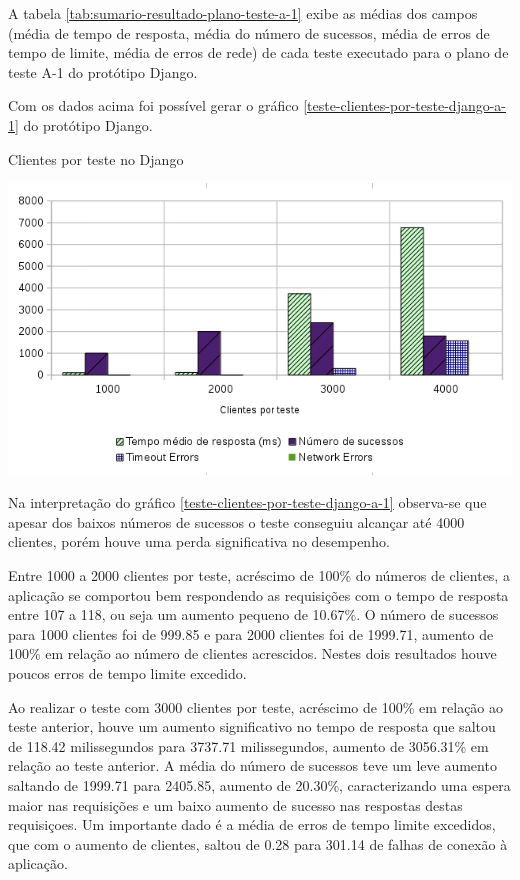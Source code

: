   A tabela \ref{tab:sumario-resultado-plano-teste-a-1} exibe as médias dos campos (média de tempo de resposta,
  média do número de sucessos, média de erros de tempo de limite, média de erros de rede) de cada teste executado
  para o plano de teste A-1 do protótipo Django.

  Com os dados acima foi possível gerar o gráfico \ref{teste-clientes-por-teste-django-a-1} do
  protótipo Django.

  \begin{grafico}[H]
    \setlength{\abovecaptionskip}{5pt}
    \setlength{\belowcaptionskip}{0pt}
    
    \caption[Clientes por teste no Django]
	    {Clientes por teste no Django}
    \centering
    \includegraphics[width=.80\textwidth]{imagem/graficos/grafico_django_plano_de_teste_1.png}
    \captionsetup[grafico]{justification=centering}
    \label{teste-clientes-por-teste-django-a-1}
  \end{grafico}

  Na interpretação do gráfico \ref{teste-clientes-por-teste-django-a-1}  observa-se que apesar dos baixos números de sucessos o teste
  conseguiu alcançar até 4000 clientes, porém houve uma perda significativa no desempenho.

  Entre 1000 a 2000 clientes por teste, acréscimo de 100\% do números de clientes, a aplicação se comportou bem respondendo as requisições com o tempo de resposta entre
  107 a 118, ou seja um aumento pequeno de 10.67\%. O número de sucessos para 1000 clientes foi de 999.85 e para 2000 clientes foi de 1999.71, aumento
  de 100\% em relação ao número de clientes acrescidos. Nestes dois resultados houve poucos erros de tempo limite excedido.

  Ao realizar o teste com 3000 clientes por teste, acréscimo de 100\% em relação ao teste anterior, houve um aumento significativo no tempo de resposta
  que saltou de 118.42 milissegundos para 3737.71 milissegundos, aumento de  3056.31\% em relação ao teste anterior. A média do número de sucessos
  teve um leve aumento saltando de 1999.71 para 2405.85, aumento de 20.30\%, caracterizando uma espera maior nas requisições e um baixo aumento
  de sucesso nas respostas destas requisiçoes. Um importante dado é a média de erros de tempo limite excedidos, que com o aumento de clientes,
  saltou de 0.28 para 301.14 de falhas de conexão à aplicação.

